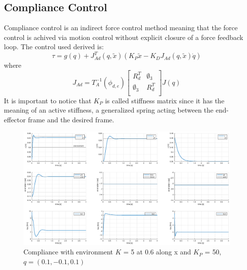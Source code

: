 \documentclass[a4paper,12pt]{article}
\begin{document}
\newpage
\subsection{Compliance Control}
Compliance control is an indirect force control method meaning that the force control is achived via motion control without explicit closure of a force feedback loop. The control used derived is:
\[
    \tau = g(q) + J_{Ad}^T(q,\tilde{x})\left( K_P\tilde{x} - K_DJ_{Ad} (q,\tilde{x})\dot{q}\right)
\]
where
\[
    J_{Ad} = T_A^{-1}(\phi_{d,e})\begin{bmatrix}
        R_d^T & \emptyset_3 \\ 
    \emptyset_3 &     R_d^T \\
    \end{bmatrix} J(q)
\]
It is important to notice that $K_P$ is called stiffness matrix since it has the meaning of an active stiffness, a generalized spring acting between the end-effector frame and the desired frame.

\begin{figure}[H]
    \begin{center}
        \hspace*{-4.5cm}
        \includegraphics[scale=0.5]{images/compliance_soft.eps}
    \end{center}
    \caption{Compliance with environment $K$ = 5 at 0.6 along x and $K_P$ = 50, $q = (0.1,-0.1,0.1)$}
    \label{fig:compliance_soft}
\end{figure}
\end{document}
